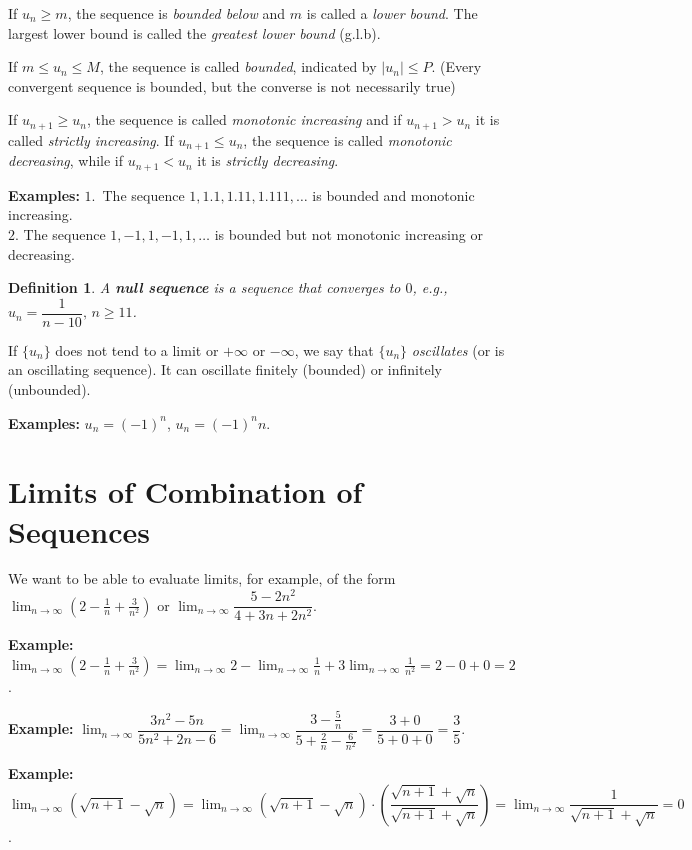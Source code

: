 \documentclass[titlepage,a4paper,12pt]{report}
\newtheorem{definition}{Definition}[section]
\begin{document}
\noindent If $u_n\geq m$, the sequence is \textit{bounded below} and $m$ is called a \textit{lower bound}. The largest lower bound is called the \textit{greatest lower bound} (g.l.b).

\noindent If $m\leq u_n\leq M$, the sequence is called \textit{bounded}, indicated by $|u_n|\leq P$. (Every convergent sequence is bounded, but the converse is not necessarily true)

\noindent If $u_{n+1}\geq u_n$, the sequence is called \textit{monotonic increasing} and if $u_{n+1}>u_n$ it is called \textit{strictly increasing}. If $u_{n+1}\leq u_n$, the sequence is called \textit{monotonic decreasing}, while if $u_{n+1}<u_n$ it is \textit{strictly decreasing}.

\noindent \textbf{Examples:} $1.$\, The sequence $1, 1.1, 1.11, 1.111, \dots$ is bounded and monotonic increasing.\\
$2.$ The sequence $1,-1,1,-1,1,\dots$ is bounded but not monotonic increasing or decreasing.
\begin{definition}
A \textbf{null sequence} is a sequence that converges to $0$, e.g., $u_n=\dfrac{1}{n-10}, \, n\geq 11$.
\end{definition}
\noindent If $\{u_n\}$ does not tend to a limit or $+\infty$ or $-\infty $, we say that $\{u_n\}$ \textit{oscillates} (or is an oscillating sequence). It can oscillate finitely (bounded) or infinitely (unbounded).

\noindent \textbf{Examples:} $u_n=(-1)^n$, \quad $u_n=(-1)^n n$.

\section{Limits of Combination of Sequences}
We want to be able to evaluate limits, for example, of the form $\displaystyle \lim _{n\rightarrow \infty}\left(2-\frac{1}{n}+\frac{3}{n^2}\right)$ or $\displaystyle \lim _{n\rightarrow \infty} \dfrac{5-2n^2}{4+3n+2n^2}$.

\noindent \textbf{Example:} $\displaystyle \lim _{n\rightarrow \infty}\left(2-\frac{1}{n}+\frac{3}{n^2}\right)=\lim _{n\rightarrow \infty} 2-\lim _{n\rightarrow \infty}\frac{1}{n}+3\lim _{n\rightarrow \infty}\frac{1}{n^2}=2-0+0=2$.

\noindent \textbf{Example:} $\displaystyle \lim _{n\rightarrow \infty} \dfrac{3n^2-5n}{5n^2+2n-6}=\lim _{n\rightarrow \infty} \dfrac{3-\frac{5}{n}}{5+\frac{2}{n}-\frac{6}{n^2}}=\dfrac{3+0}{5+0+0}=\dfrac{3}{5}$.

\noindent \textbf{Example:} $\displaystyle \lim _{n\rightarrow \infty}(\sqrt{n+1}-\sqrt{n})=\lim _{n\rightarrow \infty}(\sqrt{n+1}-\sqrt{n})\cdot \left(\dfrac{\sqrt{n+1}+\sqrt{n}}{\sqrt{n+1}+\sqrt{n}}\right)=\lim _{n \rightarrow \infty}\dfrac{1}{\sqrt{n+1}+\sqrt{n}}=0$.
\end{document}
